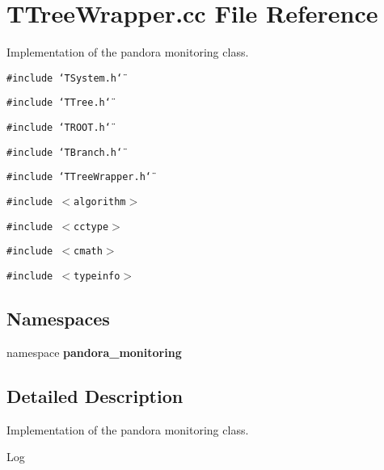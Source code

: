 \section{TTree\-Wrapper.cc File Reference}
\label{TTreeWrapper_8cc}
Implementation of the pandora monitoring class. 

{\tt \#include \char`\"{}TSystem.h\char`\"{}}\par
{\tt \#include \char`\"{}TTree.h\char`\"{}}\par
{\tt \#include \char`\"{}TROOT.h\char`\"{}}\par
{\tt \#include \char`\"{}TBranch.h\char`\"{}}\par
{\tt \#include \char`\"{}TTree\-Wrapper.h\char`\"{}}\par
{\tt \#include $<$algorithm$>$}\par
{\tt \#include $<$cctype$>$}\par
{\tt \#include $<$cmath$>$}\par
{\tt \#include $<$typeinfo$>$}\par
\subsection*{Namespaces}
\begin{CompactItemize}
\item 
namespace \textbf{pandora\_\-monitoring}
\end{CompactItemize}


\subsection{Detailed Description}
Implementation of the pandora monitoring class. 

\begin{Desc}
\item[Log]\end{Desc}

